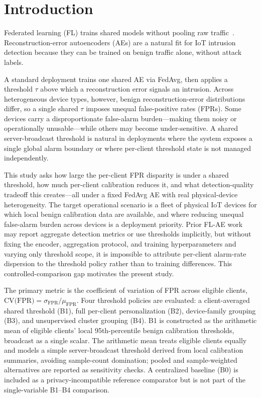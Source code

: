 \section{Introduction}
\label{sec:introduction}

Federated learning (FL) trains shared models without pooling raw traffic~\cite{mcmahan2017communication}.
Reconstruction-error autoencoders (AEs) are a natural fit for IoT intrusion detection
because they can be trained on benign traffic alone, without attack labels.

A standard deployment trains one shared AE via FedAvg, then applies a threshold $\tau$
above which a reconstruction error signals an intrusion.
Across heterogeneous device types, however, benign reconstruction-error
distributions differ, so a single shared $\tau$ imposes unequal
false-positive rates (FPRs).
Some devices carry a disproportionate false-alarm burden---making them noisy
or operationally unusable---while others may become under-sensitive.
A shared server-broadcast threshold is natural in deployments where the system
exposes a single global alarm boundary or where per-client threshold state is
not managed independently.

This study asks how large the per-client FPR disparity is under a shared threshold,
how much per-client calibration reduces it, and what detection-quality tradeoff
this creates---all under a fixed FedAvg AE with real physical-device heterogeneity.
The target operational scenario is a fleet of physical IoT devices for which
local benign calibration data are available, and where reducing unequal
false-alarm burden across devices is a deployment priority.
Prior FL-AE work may report aggregate detection metrics or use thresholds implicitly,
but without fixing the encoder, aggregation protocol, and training hyperparameters and
varying only threshold scope, it is impossible to attribute per-client alarm-rate
dispersion to the threshold policy rather than to training differences.
This controlled-comparison gap motivates the present study.

The primary metric is the coefficient of variation of FPR across eligible clients,
$\text{CV(FPR)} = \sigma_{\text{FPR}} / \mu_{\text{FPR}}$.
Four threshold policies are evaluated: a client-averaged shared threshold (B1), full per-client
personalization (B2), device-family grouping (B3), and unsupervised cluster grouping (B4).
B1 is constructed as the arithmetic mean of eligible clients' local 95th-percentile
benign calibration thresholds, broadcast as a single scalar.
The arithmetic mean treats eligible clients equally and models a simple server-broadcast
threshold derived from local calibration summaries, avoiding sample-count domination;
pooled and sample-weighted alternatives are reported as sensitivity checks.
A centralized baseline (B0) is included as a privacy-incompatible reference
comparator but is not part of the single-variable B1--B4 comparison.

